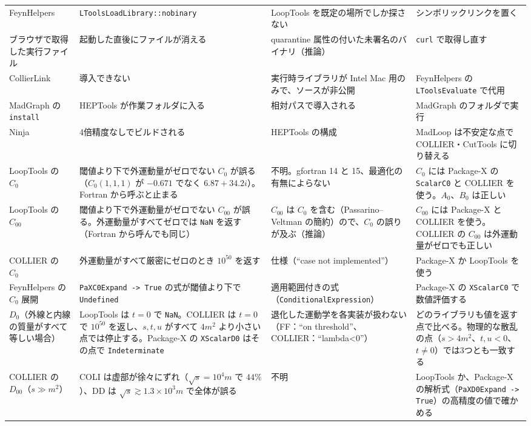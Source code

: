 \documentclass[a4paper,10pt]{ltjsarticle}
\newcommand{\bq}{\textasciigrave}
\begin{document}
\begin{table}[p]
\begin{tabularx}{\linewidth}{>{\raggedright\arraybackslash}p{2.4cm}>{\raggedright\arraybackslash}X>{\raggedright\arraybackslash}X>{\raggedright\arraybackslash}X}
FeynHelpers & \texttt{LToolsLoadLibrary\allowbreak ::nobinary} & LoopTools を既定の場所でしか探さない & シンボリックリンクを置く \\
ブラウザで取得した実行ファイル & 起動した直後にファイルが消える & quarantine 属性の付いた未署名のバイナリ（推論） & \texttt{curl} で取得し直す \\
CollierLink & 導入できない & 実行時ライブラリが Intel Mac 用のみで、ソースが非公開 & FeynHelpers の \texttt{LToolsEvaluate} で代用 \\
MadGraph の \texttt{install} & HEPTools が作業フォルダに入る & 相対パスで導入される & MadGraph のフォルダで実行 \\
Ninja & 4倍精度なしでビルドされる & HEPTools の構成 & MadLoop は不安定な点で COLLIER・CutTools に切り替える \\
LoopTools の $C_0$ & 閾値より下で外運動量がゼロでない $C_0$ が誤る（$C_0(1,1,1)$ が $-0.671$ でなく $6.87+34.2i$）。Fortran から呼ぶと止まる & 不明。gfortran 14 と 15、最適化の有無によらない & $C_0$ には Package-X の \texttt{ScalarC0} と COLLIER を使う。$A_0$、$B_0$ は正しい \\
LoopTools の $C_{00}$ & 閾値より下で外運動量がゼロでない $C_{00}$ が誤る。外運動量がすべてゼロでは \texttt{NaN} を返す（Fortran から呼んでも同じ） & $C_{00}$ は $C_0$ を含む（Passarino--Veltman の簡約）ので、$C_0$ の誤りが及ぶ（推論） & $C_{00}$ には Package-X と COLLIER を使う。COLLIER の $C_{00}$ は外運動量がゼロでも正しい \\
COLLIER の $C_0$ & 外運動量がすべて厳密にゼロのとき $10^{50}$ を返す & 仕様（``case not implemented''） & Package-X か LoopTools を使う \\
FeynHelpers の $C_0$ 展開 & \texttt{PaXC0Expand -> True} の式が閾値より下で \texttt{Undefined} & 適用範囲付きの式（\texttt{ConditionalExpression}） & Package-X の \texttt{X\bq ScalarC0} で数値評価する \\
$D_0$（外線と内線の質量がすべて等しい場合） & LoopTools は $t=0$ で \texttt{NaN}。COLLIER は $t=0$ で $10^{50}$ を返し、$s,t,u$ がすべて $4m^2$ より小さい点では停止する。Package-X の \texttt{X\bq ScalarD0} はその点で \texttt{Indeterminate} & 退化した運動学を各実装が扱わない（FF：``on threshold''、COLLIER：``lambda<0''） & どのライブラリも値を返す点で比べる。物理的な散乱の点（$s>4m^2$、$t,u<0$、$t\ne0$）では3つとも一致する \\
COLLIER の $D_{00}$（$s\gg m^2$） & COLI は虚部が徐々にずれ（$\sqrt s=10^4m$ で $44\%$）、DD は $\sqrt s\gtrsim1.3\times10^3m$ で全体が誤る & 不明 & LoopTools か、Package-X の解析式（\texttt{PaXD0Expand -> True}）の高精度の値で確かめる \\

\end{tabularx}
\end{table}
\end{document}
